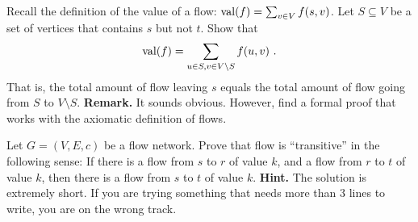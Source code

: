 
\begin{exercise}
   Recall the definition of the value of a flow: ${\rm val}(f) = \sum_{v \in V} f(s,v)$.
   Let $S \subseteq V$ be a set of vertices that contains $s$ but not $t$. Show that
   \begin{align*}
         {\rm val}(f) = \sum_{u \in S, v \in V \setminus S} f(u,v) \ .
   \end{align*}
   That is, the total amount of flow leaving $s$ equals the total amount of flow 
   going from $S$ to $V \setminus S$.
   \textbf{Remark.} It sounds obvious. However, find a formal proof that works with the 
   axiomatic definition of flows. 
\end{exercise}


\begin{exercise}
Let $G = (V,E,c)$ be a flow network.
  Prove that flow is ``transitive'' in the following sense: 
  If there is a flow from $s$ to $r$ of value $k$,
  and a flow from $r$ to $t$ of value $k$, then
  there is a flow from $s$ to $t$ of value $k$.
  \textbf{Hint.} The solution is extremely short. If you are trying
  something that needs more than 3 lines to write, you are on the wrong
  track.
\end{exercise}

